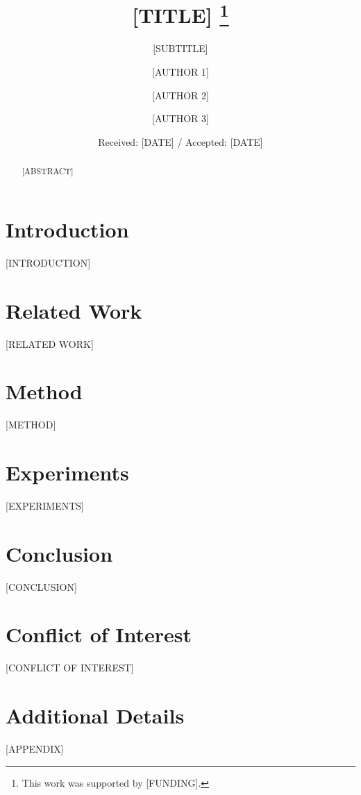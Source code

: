 \documentclass{svjour3}
\theoremstyle{plain}
\theoremstyle{definition}
\theoremstyle{remark}
\begin{document}
\title{[TITLE]
\thanks{This work was supported by [FUNDING].}
}
\subtitle{[SUBTITLE]}

\author{
  [AUTHOR 1] \and
  [AUTHOR 2] \and
  [AUTHOR 3]
}

\institute{
  [AUTHOR 1] \at
  [AFFILIATION 1] \\
  \email{[EMAIL 1]}
  \and
  [AUTHOR 2] \at
  [AFFILIATION 2] \\
  \email{[EMAIL 2]}
  \and
  [AUTHOR 3] \at
  [AFFILIATION 3] \\
  \email{[EMAIL 3]}
}

\date{Received: [DATE] / Accepted: [DATE]}

\maketitle

\begin{abstract}
[ABSTRACT]
\keywords{[KEYWORDS]}
\end{abstract}

\section{Introduction}
\label{sec:intro}
[INTRODUCTION]

\section{Related Work}
\label{sec:related}
[RELATED WORK]

\section{Method}
\label{sec:method}
[METHOD]

\section{Experiments}
\label{sec:experiments}
[EXPERIMENTS]

\section{Conclusion}
\label{sec:conclusion}
[CONCLUSION]

\begin{acknowledgements}
[ACKNOWLEDGMENTS]
\end{acknowledgements}

\section*{Conflict of Interest}
[CONFLICT OF INTEREST]




\appendix
\section{Additional Details}
[APPENDIX]
\end{document}
